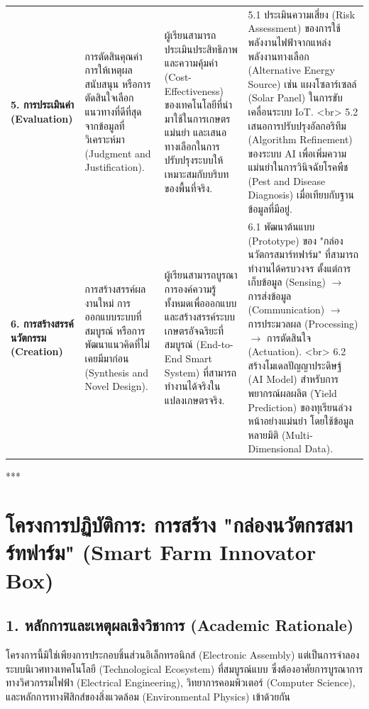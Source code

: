 \documentclass[11pt,a4paper,openany]{report}
\begin{document}
\begin{table}[htbp]
\begin{tabularx}{\textwidth}{L L L L}
\textbf{5. การประเมินค่า (Evaluation)} & การตัดสินคุณค่า การให้เหตุผลสนับสนุน หรือการตัดสินใจเลือกแนวทางที่ดีที่สุดจากข้อมูลที่วิเคราะห์มา (Judgment and Justification). & ผู้เรียนสามารถประเมินประสิทธิภาพและความคุ้มค่า (Cost-Effectiveness) ของเทคโนโลยีที่นำมาใช้ในการเกษตรแม่นยำ และเสนอทางเลือกในการปรับปรุงระบบให้เหมาะสมกับบริบทของพื้นที่จริง. & 5.1 ประเมินความเสี่ยง (Risk Assessment) ของการใช้พลังงานไฟฟ้าจากแหล่งพลังงานทางเลือก (Alternative Energy Source) เช่น แผงโซลาร์เซลล์ (Solar Panel) ในการขับเคลื่อนระบบ IoT. <br> 5.2 เสนอการปรับปรุงอัลกอริทึม (Algorithm Refinement) ของระบบ AI เพื่อเพิ่มความแม่นยำในการวินิจฉัยโรคพืช (Pest and Disease Diagnosis) เมื่อเทียบกับฐานข้อมูลที่มีอยู่. \\
\textbf{6. การสร้างสรรค์นวัตกรรม (Creation)} & การสร้างสรรค์ผลงานใหม่ การออกแบบระบบที่สมบูรณ์ หรือการพัฒนาแนวคิดที่ไม่เคยมีมาก่อน (Synthesis and Novel Design). & ผู้เรียนสามารถบูรณาการองค์ความรู้ทั้งหมดเพื่อออกแบบและสร้างสรรค์ระบบเกษตรอัจฉริยะที่สมบูรณ์ (End-to-End Smart System) ที่สามารถทำงานได้จริงในแปลงเกษตรจริง. & 6.1 พัฒนาต้นแบบ (Prototype) ของ "กล่องนวัตกรสมาร์ทฟาร์ม" ที่สามารถทำงานได้ครบวงจร ตั้งแต่การเก็บข้อมูล (Sensing) $\rightarrow$ การส่งข้อมูล (Communication) $\rightarrow$ การประมวลผล (Processing) $\rightarrow$ การตัดสินใจ (Actuation). <br> 6.2 สร้างโมเดลปัญญาประดิษฐ์ (AI Model) สำหรับการพยากรณ์ผลผลิต (Yield Prediction) ของทุเรียนล่วงหน้าอย่างแม่นยำ โดยใช้ข้อมูลหลายมิติ (Multi-Dimensional Data). \\
\bottomrule
\end{tabularx}
\end{table}


***

\section{โครงการปฏิบัติการ: การสร้าง "กล่องนวัตกรสมาร์ทฟาร์ม" (Smart Farm Innovator Box)}


\subsection{1. หลักการและเหตุผลเชิงวิชาการ (Academic Rationale)}


โครงการนี้มิใช่เพียงการประกอบชิ้นส่วนอิเล็กทรอนิกส์ (Electronic Assembly) แต่เป็นการจำลองระบบนิเวศทางเทคโนโลยี (Technological Ecosystem) ที่สมบูรณ์แบบ ซึ่งต้องอาศัยการบูรณาการทางวิศวกรรมไฟฟ้า (Electrical Engineering), วิทยาการคอมพิวเตอร์ (Computer Science), และหลักการทางฟิสิกส์ของสิ่งแวดล้อม (Environmental Physics) เข้าด้วยกัน
\end{document}

